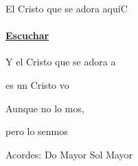 \documentclass[12pt, spanish]{book}
\newcommand{\NotCCLIed}{\relax}
\begin{document}
    \begin{song}{El Cristo que se adora aquí}{C}
        {} %
        {}
        {} %
        {} %
        \ifChordBk
            \paragraph{\mbox{}\hfill\protect\href{https://open.spotify.com/intl-es/track/0L7sOCVDApQLsXp5iJyVqE}{Escuchar}\mbox{}\hfill}
        \fi

        \begin{SBOpGroup}
            Y el Cristo que se adora a

            es un Cristo vo

            Aunque no lo mos,

            pero lo senmos
        \end{SBOpGroup}

        \ifChordBk
        \begin{SBOpGroup}
            Acordes:\break
            \upchord{\C}\qquad Do Mayor \hfill
            \upchord{\G}\qquad Sol Mayor \hfill\null\break
        \end{SBOpGroup}
        \fi
    \end{song}
\end{document}
